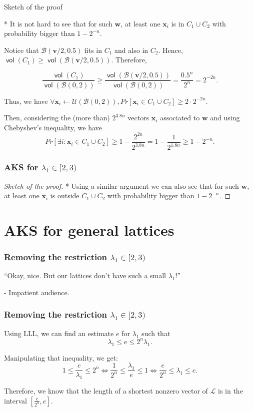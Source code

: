 \documentclass[aspectratio=43]{beamer}
\newcommand{\ball}[1]{\mathcal{B}(0, #1)}
\DeclareMathOperator{\vol}{\textsf{vol}}
\let\vec\mathbf %
\theoremstyle{remark}
\begin{document}
\begin{frame}
Sketch of the proof
\vspace*{0.25cm}

* It is not hard to see that for such $\vec{w}$, at least one $\vec{x}_i$ is in 
$C_1 \cup C_2$ with probability bigger than $1 - 2^{-n}$.

Notice that $\mathcal{B}(\vec{v}/2, 0.5)$ fits in $C_1$ and also in $C_2$. 
Hence, $\vol(C_1) \ge \vol(\mathcal{B}(\vec{v}/2, 0.5))$. Therefore, 

$$\frac{\vol(C_1)}{\vol(\ball{2})} \ge \frac{\vol(\mathcal{B}(\vec{v}/2, 
0.5))}{\vol(\ball{2})} = \frac{0.5^n}{2^n} = 2^{-2n}.$$

Thus, we have $\forall \vec{x}_i \leftarrow \mathcal{U}\left(\ball{2}\right), 
Pr[\vec{x}_i \in C_1 \cup C_2] \ge 2\cdot 2^{-2n}$.

Then, considering the (more than) $2^{3.8n}$ vectors $\vec{x}_i$ associated to 
$\vec{w}$ and using Chebyshev's inequality, we have 
$$Pr[\exists i : \vec{x}_i \in C_1 \cup C_2] \ge 1 - 
\frac{2^{2n}}{2^{3.8n}} = 1 - \frac{1}{2^{1.8n}} \ge 1 - 2^{-n}.$$

\end{frame}


\begin{frame}
\frametitle{AKS for $\lambda_1 \in [2, 3)$}

\begin{proof}[Sketch of the proof]
* Using a similar argument we can also see that for such $\vec{w}$, at least 
one $\vec{x}_i$ is outside $C_1 \cup C_2$ with probability bigger than $1 - 
2^{-n}$.
\end{proof}
\end{frame}


\section{AKS for general lattices}
\begin{frame}
\frametitle{Removing the restriction $\lambda_1 \in [2, 3)$}

``Okay, nice. But our lattices don't have such a small $\lambda_1$!''

\hfill - Impatient audience.

\end{frame}

\begin{frame}
\frametitle{Removing the restriction $\lambda_1 \in [2, 3)$}

Using LLL, we can find an estimate $e$ for $\lambda_1$ such that
$$\lambda_1 \le e \le 2^n\lambda_1.$$

Manipulating that inequality, we get:
$$1 \le \frac{e}{\lambda_1} \le 2^n \Leftrightarrow \frac{1}{2^n} \le 
\frac{\lambda_1}{e} \le 1
\Leftrightarrow \frac{e}{2^n} \le \lambda_1 \le e.$$

Therefore, we know that the length of a shortest nonzero vector of 
$\mathcal{L}$ is in the interval $\left[ \frac{e}{2^{n}}, e \right]$.

\end{frame}
\end{document}
